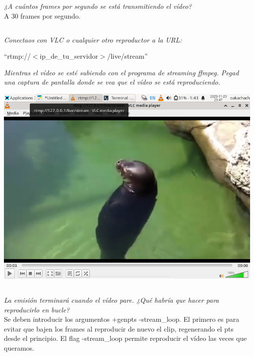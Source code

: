 \documentclass[spanish]{article}
\begin{document}
\textit{¿A cuántos frames por segundo se está transmitiendo
el vídeo?}\\

A 30 frames por segundo.

\subsection{}

\textit{Conectaos con VLC o cualquier otro reproductor a la
URL:}

\begin{center}
``rtmp://\(<\)ip\_de\_tu\_servidor\(>\)/live/stream''
\end{center}

\textit{Mientras el vídeo se esté subiendo con el programa de
streaming ffmpeg. Pegad una captura de pantalla donde se vea
que el vídeo se está reproduciendo.}

\begin{center}
\includegraphics[scale=0.45]{../img/5.png}
\end{center}

\subsection{}

\textit{La emisión terminará cuando el vídeo pare. ¿Qué
habría que hacer para reproducirlo en bucle?}\\

Se deben introducir los argumentos +genpts -stream\_loop. El
primero es para evitar que bajen los frames al reproducir de
nuevo el clip, regenerando el pts desde el principio. El
flag -stream\_loop permite reproducir el vídeo las veces que
queramos.\\
\end{document}
